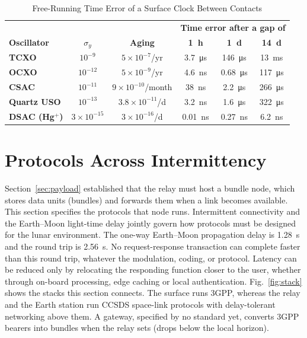 \documentclass{IEEEoj}
\begin{document}
\begin{table}[!t]
\caption{Free-Running Time Error of a Surface Clock Between Contacts}
\label{tab:holdover}
\centering
\footnotesize
\setlength{\tabcolsep}{3pt}
\begin{tabularx}{\columnwidth}{@{}>{\raggedright\arraybackslash\bfseries}Xccccc}
\toprule
\rowcolor{tabhead} & & & \multicolumn{3}{c}{\textbf{Time error after a gap of}} \\
\rowcolor{tabhead}\textbf{Oscillator} & \textbf{$\sigma_y$} & \textbf{Aging} & \textbf{\SI{1}{h}} & \textbf{\SI{1}{d}} & \textbf{\SI{14}{d}} \\
\midrule
TCXO & $10^{-9}$ & $5\times10^{-7}$/yr & \SI{3.7}{\micro\second} & \SI{146}{\micro\second} & \SI{13}{ms} \\
OCXO & $10^{-12}$ & $5\times10^{-9}$/yr & \SI{4.6}{ns} & \SI{0.68}{\micro\second} & \SI{117}{\micro\second} \\
CSAC & $10^{-11}$ & $9\times10^{-10}$/month & \SI{38}{ns} & \SI{2.2}{\micro\second} & \SI{266}{\micro\second} \\
Quartz USO & $10^{-13}$ & $3.8\times10^{-11}$/d & \SI{3.2}{ns} & \SI{1.6}{\micro\second} & \SI{322}{\micro\second} \\
DSAC (Hg$^{+}$) & $3\times10^{-15}$ & $3\times10^{-16}$/d & \SI{0.01}{ns} & \SI{0.27}{ns} & \SI{6.2}{ns} \\
\bottomrule
\end{tabularx}
\end{table}


\section{Protocols Across Intermittency}
\label{sec:protocol}
Section~\ref{sec:payload} established that the relay must host a bundle node, which stores data units (bundles) and forwards them when a link becomes available. This section specifies the protocols that node runs. Intermittent connectivity and the Earth--Moon light-time delay jointly govern how protocols must be designed for the lunar environment. The one-way Earth--Moon propagation delay is \SI{1.28}{\second} and the round trip is \SI{2.56}{\second}. No request-response transaction can complete faster than this round trip, whatever the modulation, coding, or protocol. Latency can be reduced only by relocating the responding function closer to the user, whether through on-board processing, edge caching or local authentication. Fig.~\ref{fig:stack} shows the stacks this section connects. The surface runs 3GPP, whereas the relay and the Earth station run CCSDS space-link protocols with delay-tolerant networking above them. A gateway, specified by no standard yet, converts 3GPP bearers into bundles when the relay sets (drops below the local horizon).
\end{document}
